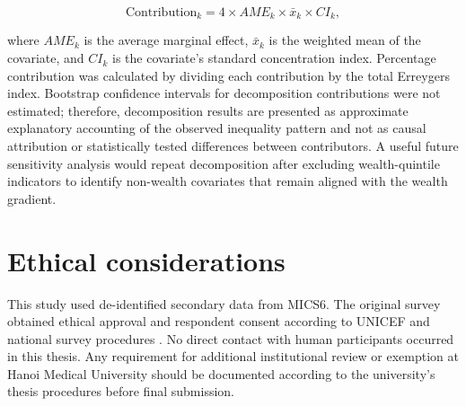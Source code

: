 \begin{equation}
\text{Contribution}_k = 4 \times AME_k \times \bar{x}_k \times CI_k,
\end{equation}

\noindent where $AME_k$ is the average marginal effect, $\bar{x}_k$ is the weighted mean of the covariate, and $CI_k$ is the covariate's standard concentration index. Percentage contribution was calculated by dividing each contribution by the total Erreygers index. Bootstrap confidence intervals for decomposition contributions were not estimated; therefore, decomposition results are presented as approximate explanatory accounting of the observed inequality pattern and not as causal attribution or statistically tested differences between contributors. A useful future sensitivity analysis would repeat decomposition after excluding wealth-quintile indicators to identify non-wealth covariates that remain aligned with the wealth gradient.

\section{Ethical considerations}

This study used de-identified secondary data from MICS6. The original survey obtained ethical approval and respondent consent according to UNICEF and national survey procedures \cite{unicef2022}. No direct contact with human participants occurred in this thesis. Any requirement for additional institutional review or exemption at Hanoi Medical University should be documented according to the university's thesis procedures before final submission.

\clearpage
